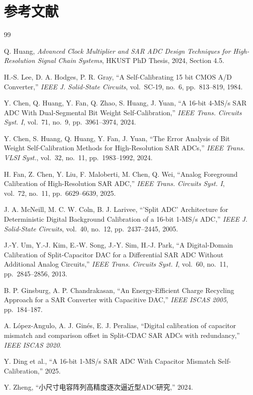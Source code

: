 \documentclass[UTF8,a4paper,12pt]{ctexart}
\theoremstyle{definition}
\begin{document}
\section*{参考文献}

\begin{thebibliography}{99}

Q. Huang,
\textit{Advanced Clock Multiplier and SAR ADC Design Techniques for
High-Resolution Signal Chain Systems},
HKUST PhD Thesis, 2024, Section 4.5.

H.-S. Lee, D. A. Hodges, P. R. Gray,
``A Self-Calibrating 15 bit CMOS A/D Converter,''
\textit{IEEE J. Solid-State Circuits}, vol.~SC-19, no.~6, pp.~813--819, 1984.

Y. Chen, Q. Huang, Y. Fan, Q. Zhao, S. Huang, J. Yuan,
``A 16-bit 4-MS/s SAR ADC With Dual-Segmental Bit Weight Self-Calibration,''
\textit{IEEE Trans. Circuits Syst. I}, vol.~71, no.~9, pp.~3961--3974, 2024.

Y. Chen, S. Huang, Q. Huang, Y. Fan, J. Yuan,
``The Error Analysis of Bit Weight Self-Calibration Methods for
High-Resolution SAR ADCs,''
\textit{IEEE Trans. VLSI Syst.}, vol.~32, no.~11, pp.~1983--1992, 2024.

H. Fan, Z. Chen, Y. Liu, F. Maloberti, M. Chen, Q. Wei,
``Analog Foreground Calibration of High-Resolution SAR ADC,''
\textit{IEEE Trans. Circuits Syst. I}, vol.~72, no.~11, pp.~6629--6639, 2025.

J. A. McNeill, M. C. W. Coln, B. J. Larivee,
``'Split ADC' Architecture for Deterministic Digital Background Calibration
of a 16-bit 1-MS/s ADC,''
\textit{IEEE J. Solid-State Circuits}, vol.~40, no.~12, pp.~2437--2445, 2005.

J.-Y. Um, Y.-J. Kim, E.-W. Song, J.-Y. Sim, H.-J. Park,
``A Digital-Domain Calibration of Split-Capacitor DAC for a Differential SAR ADC
Without Additional Analog Circuits,''
\textit{IEEE Trans. Circuits Syst. I}, vol.~60, no.~11, pp.~2845--2856, 2013.

B. P. Ginsburg, A. P. Chandrakasan,
``An Energy-Efficient Charge Recycling Approach for a SAR Converter
with Capacitive DAC,''
\textit{IEEE ISCAS 2005}, pp.~184--187.

A. L\'{o}pez-Angulo, A. J. Gin\'{e}s, E. J. Peralias,
``Digital calibration of capacitor mismatch and comparison offset in
Split-CDAC SAR ADCs with redundancy,''
\textit{IEEE ISCAS 2020}.

Y. Ding et al.,
``A 16-bit 1-MS/s SAR ADC With Capacitor Mismatch Self-Calibration,''
2025.

Y. Zheng,
``小尺寸电容阵列高精度逐次逼近型ADC研究,''
2024.

\end{thebibliography}

\end{document}

